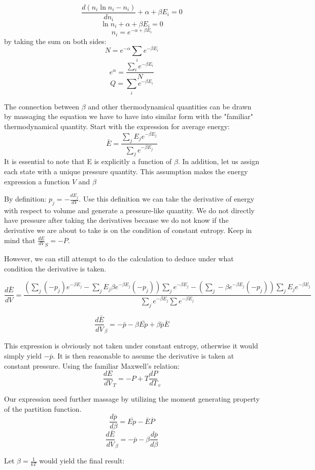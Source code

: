 \documentclass[12pt, oneside]{article}   	%
\begin{document}
$$\frac{d (n_i \ln n_i - n_i)}{d n_i} + \alpha + \beta E_i = 0
$$
$$\ln n_i  + \alpha + \beta E_i = 0 
$$
$$n_i = e^{-\alpha + \beta E_i}$$
by taking the sum on both sides: 
$$N = e^{-\alpha} \sum_i e^{-\beta E_i}$$
$$e^{\alpha} = \frac{\sum_i e^{-\beta E_i}}{N}$$
$$Q =  \sum_i e^{-\beta E_i} $$ 
\par 
The connection between $\beta$ and other thermodynamical quantities can be drawn by massaging the equation we have to have into similar form with the "familiar" thermodynamical quantity. Start with the expression for average energy:
$$\bar{E} = \frac{\sum_j E_j e^{-\beta E_j}}{\sum_j e^{-\beta E_j}}$$
It is essential to note that E is explicitly a function of $\beta$. In addition, let us assign each state with a unique pressure quantity. This assumption makes the energy expression a function $V$ and $\beta$

By definition: $p_j = -\frac{d E_j}{d V}$. Use this definition we can take the derivative of energy with respect to volume and generate a pressure-like quantity. We do not directly have pressure after taking the derivatives because we do not know if the derivative we are about to take is on the condition of constant entropy. Keep in mind that $\frac{dE}{dV}_S = - P$. 

However, we can still attempt to do the calculation to deduce under what condition the derivative is taken. 

$$\frac{d \bar{E}}{dV} = \frac{(\sum_j (-p_j) e^{-\beta E_j} - \sum_j E_j \beta e^{-\beta  E_j} (-p_j)) \sum_j e^{-\beta E_j} - ( \sum_j -\beta e^{-\beta E_j} (-p_j)  ) \sum_j E_j e^{-\beta E_j}}{\sum_j e^{-\beta E_j} \sum{e^{-\beta E_j}}}$$

$$\frac{d \bar{E}}{dV}_{\beta} = - \bar{p} - \beta \overline{Ep} + \beta \overline{p}\overline{E}$$

This expression is obviously not taken under constant entropy, otherwise it would simply yield $-\overline{p}$. It is then reasonable to assume the derivative is taken at constant pressure. Using the familiar Maxwell's relation:
$$\frac{dE}{dV}_T = - P + T \frac{dP}{dT}_v$$

Our expression need further massage by utilizing the moment generating property of the partition function. 
$$\frac{d \overline{p}}{d \beta} = \overline{Ep} - \overline{E}\overline{P} $$
$$\frac{d \bar{E}}{dV}_{\beta} = -\overline{p} - \beta \frac{d \overline{p}}{d\beta}$$

Let $\beta = \frac{1}{k T}$ would yield the final result: 
\end{document}
